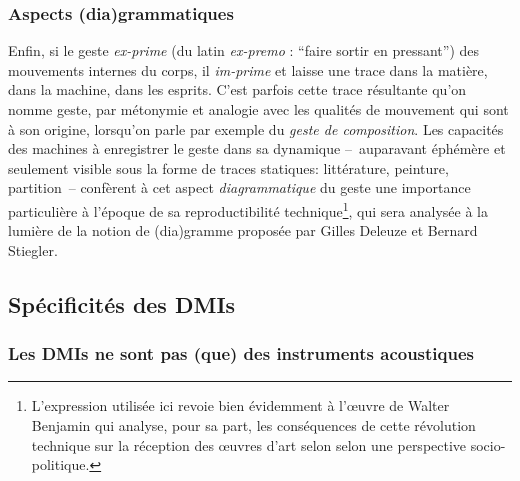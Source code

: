 \subsubsection{Aspects (dia)grammatiques}

\noindent Enfin, si le geste \textit{ex-prime} (du latin \textit{ex-premo} : ``faire sortir en pressant'') des mouvements internes du corps, il \textit{im-prime} et laisse une trace dans la matière, dans la machine, dans les esprits. C'est parfois cette trace résultante qu'on nomme geste, par métonymie et analogie avec les qualités de mouvement qui sont à son origine, lorsqu'on parle par exemple du \textit{geste de composition}. Les capacités des machines à enregistrer le geste dans sa dynamique --~auparavant éphémère et seulement visible sous la forme de traces statiques: littérature, peinture, partition~-- confèrent à cet aspect \textit{diagrammatique} du geste une importance particulière à l'époque de sa reproductibilité technique\footnote{L'expression utilisée ici revoie bien évidemment à l'œuvre de Walter Benjamin\cite{benjamin_loeuvre_2013} qui analyse, pour sa part, les conséquences de cette révolution technique sur la réception des œuvres d'art selon selon une perspective socio-politique.}, qui sera analysée à la lumière de la notion de (dia)gramme proposée par Gilles Deleuze et Bernard Stiegler.




\subsection{Spécificités des DMIs}

\subsubsection{Les DMIs ne sont pas (que) des instruments acoustiques}

